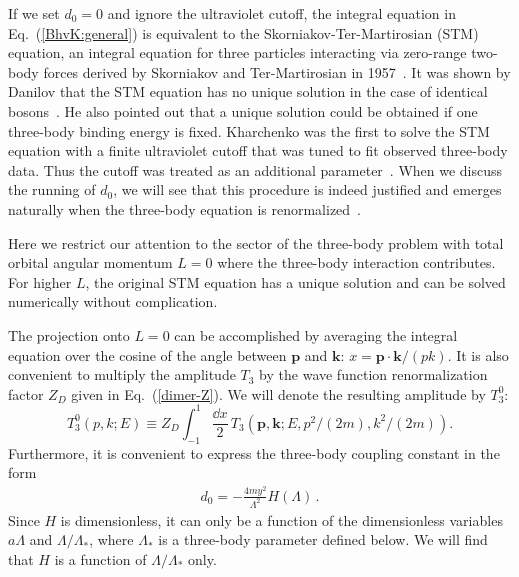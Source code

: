 If we set $d_0 = 0$ and ignore the ultraviolet cutoff, 
the integral equation in Eq.~(\ref{BhvK:general}) is equivalent to the 
Skorniakov-Ter-Martirosian (STM) equation, 
an integral equation for three particles interacting via
zero-range two-body forces derived by Skorniakov and Ter-Martirosian 
in 1957~\cite{Skorniakov:1957aa}.  
It was shown by Danilov that the STM equation has no unique 
solution in the case of identical bosons~\cite{Danilov:1961aa}. He also
pointed out that a unique solution could be obtained if one 
three-body binding energy is fixed. 
Kharchenko was the first to solve the STM equation with a finite 
ultraviolet cutoff that was tuned to fit observed three-body data.  
Thus the cutoff was treated 
as an additional parameter~\cite{Kharchenko:1973aa}. 
When we discuss the running of $d_0$, we will see
that this \adhoc procedure is indeed justified and emerges
naturally when the three-body equation is renormalized~\cite{Bedaque:1998kg}.


Here we restrict our attention to the sector of the three-body problem with 
total orbital angular momentum $L=0$ where the three-body interaction
contributes. For higher $L$, the original STM equation has a unique solution
and can be solved numerically without complication.

The projection onto $L=0$ can be accomplished
by averaging the integral equation over the cosine
of the angle between ${\bm p}$ and ${\bm k}$: $x={\bm p}\cdot{\bm k}/
(pk)$. It is also convenient to multiply the amplitude $T_3$
by the wave function renormalization factor $Z_D$ given in 
Eq.~(\ref{dimer-Z}).
We will denote the resulting amplitude by $T_3^0$:
\begin{equation}
 T_3^0(p, k; E) \equiv Z_D 
 \int_{-1}^1 \! \frac{\dd x}{2}\,
 T_3 \left({\bm p}, {\bm k}; E, p^2/(2m), k^2/(2m)\right) .
\label{A-def}
\end{equation}
Furthermore, it is convenient to express the three-body coupling constant 
in the form
\begin{eqnarray}
 d_0 = {-}\frac{4my^2}{\Lambda^2} H(\Lambda) \,.
\label{g3g2}
\end{eqnarray}
Since $H$ is dimensionless, it can only  be a
function of the dimensionless variables $a \Lambda$ and 
$\Lambda/ \Lambda_*$, where $\Lambda_*$ is a three-body 
parameter defined below. We will find that $H$ is a function of
$\Lambda/ \Lambda_*$ only.  

